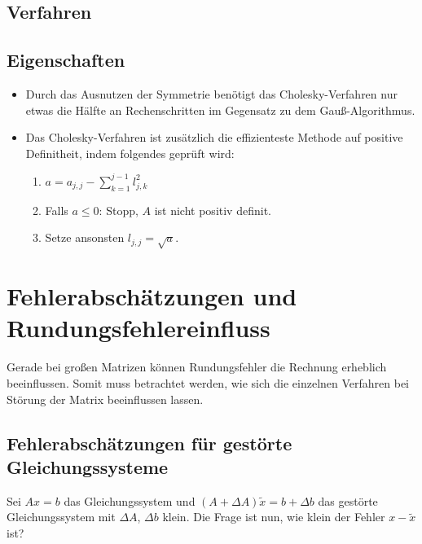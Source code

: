 			\subsection{Verfahren}
				\begin{algorithm}[H]
				\end{algorithm}

			\subsection{Eigenschaften}
				\begin{itemize}
					\item Durch das Ausnutzen der Symmetrie benötigt das Cholesky-Verfahren nur etwas die Hälfte an Rechenschritten im Gegensatz zu dem Gauß-Algorithmus.
					\item Das Cholesky-Verfahren ist zusätzlich die effizienteste Methode auf positive Definitheit, indem folgendes geprüft wird:
						\begin{enumerate}
							\item \( a = a_{j,j} - \sum_{k=1}^{j-1} l_{j,k}^2 \)
							\item Falls \( a \leq 0 \): Stopp, \(A\) ist nicht positiv definit.
							\item Setze ansonsten \( l_{j,j} = \sqrt{a} \).
						\end{enumerate}
				\end{itemize}

		\section{Fehlerabschätzungen und Rundungsfehlereinfluss}
			Gerade bei großen Matrizen können Rundungsfehler die Rechnung erheblich beeinflussen. Somit muss betrachtet werden, wie sich die einzelnen Verfahren bei Störung der Matrix beeinflussen lassen.

			\subsection{Fehlerabschätzungen für gestörte Gleichungssysteme}
				Sei \( Ax = b \) das Gleichungssystem und \( (A + \Delta\!A)\tilde{x} = b + \Delta\!b \) das gestörte Gleichungssystem mit \( \Delta\!A \), \( \Delta\!b \) klein. Die Frage ist nun, wie klein der Fehler \( x - \tilde{x} \) ist?

